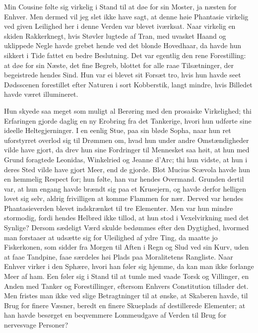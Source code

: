 \documentclass[12pt]{article}
\newcommand{\opage}[1]{\marginnote{\footnotesize\textit{[#1]}}}
\begin{document}
Min Cousine følte sig virkelig i Stand til at døe for sin Moster, ja næsten for
Enhver. Men dermed vil jeg slet ikke have sagt, at denne høie Phantasie virkelig
ved given Leilighed her i denne Verden var blevet iværksat. Naar virkelig en
skiden Rakkerknegt, hvis Støvler lugtede af Tran, med uvasket Haand og uklippede
Negle havde grebet hende ved det blonde Hovedhaar, da havde hun sikkert i Tide
fattet en bedre Beslutning. Det var egentlig den rene Forestilling: at døe for
sin Næste, det fine Begreb, blottet for alle raae Tilsætninger, der begeistrede
hendes Sind. Hun var ei blevet sit Forsæt tro, hvis hun havde seet Dødsscenen
forestillet efter Naturen i sort Kobberstik, langt mindre, hvis Billedet havde
været illumineret.

Hun skyede saa meget som muligt al Berøring med den \opage{7}prosaiske
Virkelighed; thi Erfaringen gjorde daglig en ny Erobring fra det Tankerige, hvori
hun udførte sine ideelle Heltegjerninger. I en eenlig Stue, paa sin bløde Sopha,
naar hun ret uforstyrret overlod sig til Drømmen om, hvad hun under andre
Omstændigheder vilde have gjort, da drev hun sine Fordringer til Mennesket saa
høit, at hun med Grund foragtede Leonidas, Winkelried og Jeanne d'Arc; thi hun
vidste, at hun i deres Sted vilde have gjort Meer, end de gjorde. Blot Mucius
Scævola havde hun en hemmelig Respect for; hun følte, han var hendes Overmand.
Grunden dertil var, at hun engang havde brændt sig paa et Krusejern, og havde
derfor helligen lovet sig selv, aldrig frivilligen at komme Flammen for nær.
Derved var hendes Phantasieverden blevet indskrænket til tre Elementer. Men var
hun mindre stormodig, fordi hendes Helbred ikke tillod, at hun stod i
Vexelvirkning med det Synlige? Dersom sædeligt Værd skulde bedømmes efter den
Dygtighed, hvormed man forstaaer at udsætte sig for Uleilighed af ydre Ting, da
maatte jo Fiskerkonen, som sidder fra Morgen til Aften i Regn og Slud ved sin
Kurv, uden at faae Tandpine, faae særdeles høi Plads paa Moralitetens Rangliste.
Naar Enhver virker i den Sphære, hvori han føler sig hjemme, da kan man ikke
forlange Meer af ham. Een føler sig i Stand til at tumle med vaade Torsk og
Villinger, en Anden med Tanker og Forestillinger, eftersom Enhvers Constitution
tillader det. Men fristes man ikke ved slige Betragtninger til at ønske, at
Skaberen havde, til Brug for finere Væsner, beredt en finere Skueplads af
destillerede Elementer; at han havde besørget en beqvemmere Lommeudgave af Verden
til Brug for nervesvage Personer?
\end{document}
